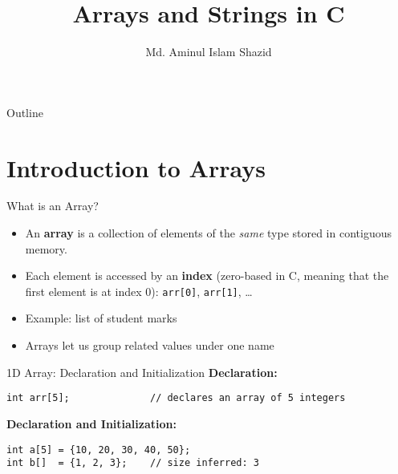\documentclass[12pt, aspectratio=169]{beamer}
\title{Arrays and Strings in C}
\author{Md. Aminul Islam Shazid}
\date{}
\begin{document}
    {
		\addtocounter{framenumber}{-2}    %

		\begin{frame}
			\titlepage
		\end{frame}

		\begin{frame}{Outline}
            \vfill
			\tableofcontents[subsectionstyle=hide]
            \vfill
		\end{frame}
	}


\section{Introduction to Arrays}


    \begin{frame}{What is an Array?}
        \begin{itemize}
            \item An \textbf{array} is a collection of elements of the \emph{same} type stored in contiguous memory.
            \item Each element is accessed by an \textbf{index} (zero-based in C, meaning that the first element is at index 0): \texttt{arr[0]}, \texttt{arr[1]}, \dots
            \item Example: list of student marks
            \item Arrays let us group related values under one name
        \end{itemize}
    \end{frame}

    \begin{frame}[fragile]{1D Array: Declaration and Initialization}
        \textbf{Declaration:}
        \begin{verbatim}
int arr[5];              // declares an array of 5 integers
        \end{verbatim}

        \textbf{Declaration and Initialization:}
        \begin{verbatim}
int a[5] = {10, 20, 30, 40, 50};
int b[]  = {1, 2, 3};    // size inferred: 3
        \end{verbatim}
    \end{frame}

\end{document}
